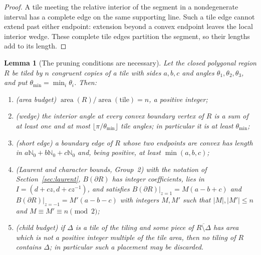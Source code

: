 \documentclass[11pt]{amsart}
\newtheorem{lemma}[theorem]{Lemma}
\theoremstyle{definition}
\theoremstyle{remark}
\newcommand{\Nzero}{\mathbb N_0}
\begin{document}
\begin{proof}
A tile meeting the relative interior of the segment in a nondegenerate
interval has a complete edge on the same supporting line.  Such a tile edge
cannot extend past either endpoint: extension beyond a convex endpoint leaves
the local interior wedge.  These complete tile edges partition the segment,
so their lengths add to its length.
\end{proof}

\begin{lemma}[The pruning conditions are necessary]\label{lem:prunes}
Let the closed polygonal region $R$ be tiled by $n$ congruent copies of a
tile with sides $a,b,c$ and angles $\theta_1,\theta_2,\theta_3$, and put
$\theta_{\min}=\min_i\theta_i$.  Then:
\begin{enumerate}[label=\textup{(\roman*)}]
\item \emph{(area budget)}
      $\operatorname{area}(R)/\operatorname{area}(\text{tile})=n$, a positive
      integer;
\item \emph{(wedge)} the interior angle at every convex boundary vertex of
      $R$ is a sum of at least one and at most
      $\lfloor\pi/\theta_{\min}\rfloor$ tile angles; in particular it is at
      least $\theta_{\min}$;
\item \emph{(short edge)} a boundary edge of $R$ whose two endpoints are
      convex has length in $a\Nzero+b\Nzero+c\Nzero$ and, being positive, at
      least $\min(a,b,c)$;
\item \emph{(Laurent and character bounds, Group~2)} with the notation of
      Section~\ref{sec:laurent}, $B(\partial R)$ has integer coefficients,
      lies in $I=(d+cz,d+cz^{-1})$, and satisfies
      $B(\partial R)|_{z=1}=M(a-b+c)$ and
      $B(\partial R)|_{z=-1}=M'(a-b-c)$ with integers $M,M'$ such that
      $|M|,|M'|\le n$ and $M\equiv M'\equiv n\pmod 2$;
\item \emph{(child budget)} if $\Delta$ is a tile of the tiling and some
      piece of $\overline{R\setminus\Delta}$ has area which is not a positive
      integer multiple of the tile area, then no tiling of $R$ contains
      $\Delta$; in particular such a placement may be discarded.
\end{enumerate}
\end{lemma}
\end{document}
